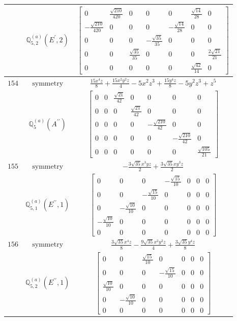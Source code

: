 \documentclass[fleqn,8pt,landscape]{jsarticle}
\begin{document}
\begin{longtable}{ccc}
$  $ & $ \mathbb{Q}_{5,2}^{(a)}(E^{\prime},2) $ & $ \begin{bmatrix} 0 & \frac{\sqrt{210}}{420} & 0 & 0 & 0 & \frac{\sqrt{14}}{28} & 0 \\ - \frac{\sqrt{210}}{420} & 0 & 0 & 0 & - \frac{\sqrt{14}}{28} & 0 & 0 \\ 0 & 0 & 0 & - \frac{\sqrt{35}}{35} & 0 & 0 & 0 \\ 0 & 0 & \frac{\sqrt{35}}{35} & 0 & 0 & 0 & \frac{2 \sqrt{21}}{21} \\ 0 & 0 & 0 & 0 & 0 & \frac{\sqrt{42}}{14} & 0 \end{bmatrix} $ \\ \hline
$ 154 $ & $ \text{symmetry} $ & $ \frac{15 x^{4} z}{8} + \frac{15 x^{2} y^{2} z}{4} - 5 x^{2} z^{3} + \frac{15 y^{4} z}{8} - 5 y^{2} z^{3} + z^{5} $ \\
$  $ & $ \mathbb{Q}_{5}^{(a)}(A^{\prime\prime}) $ & $ \begin{bmatrix} 0 & 0 & \frac{\sqrt{21}}{42} & 0 & 0 & 0 & 0 \\ 0 & 0 & 0 & \frac{\sqrt{21}}{42} & 0 & 0 & 0 \\ 0 & 0 & 0 & 0 & - \frac{\sqrt{210}}{42} & 0 & 0 \\ 0 & 0 & 0 & 0 & 0 & - \frac{\sqrt{210}}{42} & 0 \\ 0 & 0 & 0 & 0 & 0 & 0 & \frac{\sqrt{105}}{21} \end{bmatrix} $ \\ \hline
$ 155 $ & $ \text{symmetry} $ & $ - \frac{3 \sqrt{35} x^{3} y z}{2} + \frac{3 \sqrt{35} x y^{3} z}{2} $ \\
$  $ & $ \mathbb{Q}_{5,1}^{(a)}(E^{\prime\prime},1) $ & $ \begin{bmatrix} 0 & 0 & 0 & - \frac{\sqrt{15}}{10} & 0 & 0 & 0 \\ 0 & 0 & - \frac{\sqrt{15}}{10} & 0 & 0 & 0 & 0 \\ 0 & - \frac{\sqrt{10}}{10} & 0 & 0 & 0 & 0 & 0 \\ - \frac{\sqrt{10}}{10} & 0 & 0 & 0 & 0 & 0 & 0 \\ 0 & 0 & 0 & 0 & 0 & 0 & 0 \end{bmatrix} $ \\ \hline
$ 156 $ & $ \text{symmetry} $ & $ \frac{3 \sqrt{35} x^{4} z}{8} - \frac{9 \sqrt{35} x^{2} y^{2} z}{4} + \frac{3 \sqrt{35} y^{4} z}{8} $ \\
$  $ & $ \mathbb{Q}_{5,2}^{(a)}(E^{\prime\prime},1) $ & $ \begin{bmatrix} 0 & 0 & \frac{\sqrt{15}}{10} & 0 & 0 & 0 & 0 \\ 0 & 0 & 0 & - \frac{\sqrt{15}}{10} & 0 & 0 & 0 \\ \frac{\sqrt{10}}{10} & 0 & 0 & 0 & 0 & 0 & 0 \\ 0 & - \frac{\sqrt{10}}{10} & 0 & 0 & 0 & 0 & 0 \\ 0 & 0 & 0 & 0 & 0 & 0 & 0 \end{bmatrix} $ \\ \hline

\end{longtable}
\end{document}
